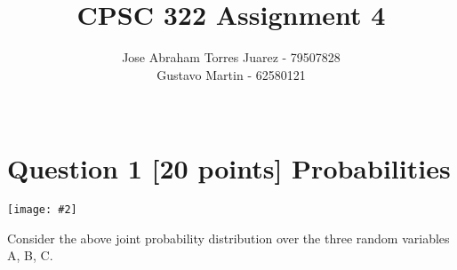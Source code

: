 \documentclass{article}
\newcommand{\centerfig}[2]{\begin{center}\texttt{[image: \#2]}\end{center}}
\begin{document}
\title{CPSC 322 Assignment 4}
\author{
    Jose Abraham Torres Juarez - 79507828 \\
    Gustavo Martin - 62580121 \\ \\
}
\date{}
\maketitle
\vspace{-2em}


\section{Question 1 [20 points] Probabilities}
\centerfig{0.35}{../figs/fig1.png}
Consider the above joint probability distribution over the three random variables A, B, C. \\
\end{document}
